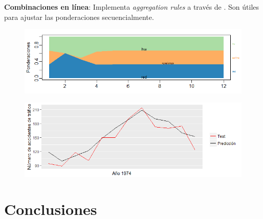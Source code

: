 \documentclass[10pt,a4paper,twoside]{beamer}
\begin{document}
\begin{frame}

\begin{itemize*}
\item \textbf{Combinaciones en línea}: Implementa \textit{aggregation rules} a través de . Son útiles para ajustar las ponderaciones secuencialmente.
\end{itemize*}

\begin{figure}
    \centering
    \centerline{\includegraphics[scale = 0.5]{Images/338.png}}
\end{figure}

\begin{figure}
    \centering
    \centerline{\includegraphics[scale = 0.5]{Images/337.png}}
\end{figure}

\end{frame}



\section{Conclusiones}
\end{document}
